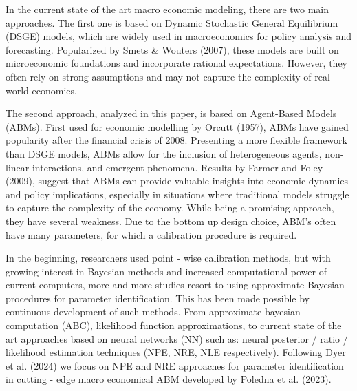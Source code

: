 \documentclass[12pt]{article}
\begin{document}
In the current state of the art macro economic modeling, there are two main  
approaches. The first one is based on Dynamic Stochastic General Equilibrium (DSGE) models, which are widely used in macroeconomics for policy analysis and forecasting. Popularized by Smets \& Wouters (2007), these models are built on microeconomic foundations and incorporate rational expectations. However, they often rely on strong assumptions and may not capture the complexity of real-world economies. 

The second approach, analyzed in this paper, is based on Agent-Based Models (ABMs). First used for economic modelling by Orcutt (1957), ABMs have gained popularity after the financial crisis of 2008. Presenting a more flexible framework than DSGE models, ABMs allow for the inclusion of heterogeneous agents, non-linear interactions, and emergent phenomena. Results by Farmer and Foley (2009), suggest that ABMs can provide valuable insights into economic dynamics and policy implications, especially in situations where traditional models struggle to capture the complexity of the economy. While being a promising approach, they have several weakness. Due to the bottom up design choice, ABM's often have many parameters, for which a calibration procedure is required. 

In the beginning, researchers used point - wise calibration methods, but with growing interest in Bayesian methods and increased computational power of current computers, more and more studies resort to using approximate Bayesian procedures for parameter identification. This has been made possible by continuous development of such methods. From approximate bayesian computation (ABC), likelihood function approximations, to current state of the art approaches based on neural networks (NN) such as: neural posterior / ratio / likelihood estimation techniques (NPE, NRE, NLE respectively). Following Dyer et al. (2024) we focus on NPE and NRE approaches for parameter identification in cutting - edge macro economical ABM developed by Poledna et al. (2023). 
\end{document}

